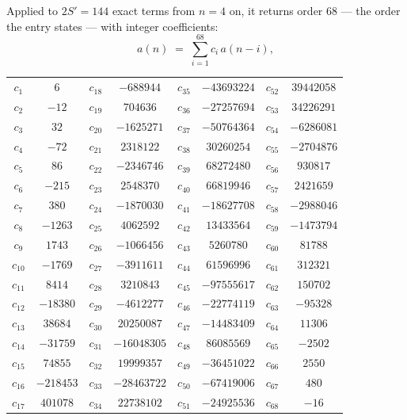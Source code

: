 \documentclass[11pt,a4paper]{article}
\theoremstyle{plain}
\theoremstyle{definition}
\begin{document}
Applied to $2S'=144$ exact terms from $n=4$ on, it returns order $68$ --- the
order the entry states --- with integer coefficients:
\[
a(n)\;=\;\sum_{i=1}^{68}c_i\,a(n-i),
\]
\begin{center}\small
\begin{tabular}{cccccccc}
$c_{1}$ & $6$ & $c_{18}$ & $-688944$ & $c_{35}$ & $-43693224$ & $c_{52}$ & $39442058$ \\
$c_{2}$ & $-12$ & $c_{19}$ & $704636$ & $c_{36}$ & $-27257694$ & $c_{53}$ & $34226291$ \\
$c_{3}$ & $32$ & $c_{20}$ & $-1625271$ & $c_{37}$ & $-50764364$ & $c_{54}$ & $-6286081$ \\
$c_{4}$ & $-72$ & $c_{21}$ & $2318122$ & $c_{38}$ & $30260254$ & $c_{55}$ & $-2704876$ \\
$c_{5}$ & $86$ & $c_{22}$ & $-2346746$ & $c_{39}$ & $68272480$ & $c_{56}$ & $930817$ \\
$c_{6}$ & $-215$ & $c_{23}$ & $2548370$ & $c_{40}$ & $66819946$ & $c_{57}$ & $2421659$ \\
$c_{7}$ & $380$ & $c_{24}$ & $-1870030$ & $c_{41}$ & $-18627708$ & $c_{58}$ & $-2988046$ \\
$c_{8}$ & $-1263$ & $c_{25}$ & $4062592$ & $c_{42}$ & $13433564$ & $c_{59}$ & $-1473794$ \\
$c_{9}$ & $1743$ & $c_{26}$ & $-1066456$ & $c_{43}$ & $5260780$ & $c_{60}$ & $81788$ \\
$c_{10}$ & $-1769$ & $c_{27}$ & $-3911611$ & $c_{44}$ & $61596996$ & $c_{61}$ & $312321$ \\
$c_{11}$ & $8414$ & $c_{28}$ & $3210843$ & $c_{45}$ & $-97555617$ & $c_{62}$ & $150702$ \\
$c_{12}$ & $-18380$ & $c_{29}$ & $-4612277$ & $c_{46}$ & $-22774119$ & $c_{63}$ & $-95328$ \\
$c_{13}$ & $38684$ & $c_{30}$ & $20250087$ & $c_{47}$ & $-14483409$ & $c_{64}$ & $11306$ \\
$c_{14}$ & $-31759$ & $c_{31}$ & $-16048305$ & $c_{48}$ & $86085569$ & $c_{65}$ & $-2502$ \\
$c_{15}$ & $74855$ & $c_{32}$ & $19999357$ & $c_{49}$ & $-36451022$ & $c_{66}$ & $2550$ \\
$c_{16}$ & $-218453$ & $c_{33}$ & $-28463722$ & $c_{50}$ & $-67419006$ & $c_{67}$ & $480$ \\
$c_{17}$ & $401078$ & $c_{34}$ & $22738102$ & $c_{51}$ & $-24925536$ & $c_{68}$ & $-16$ \\
\end{tabular}
\end{center}
\end{document}
